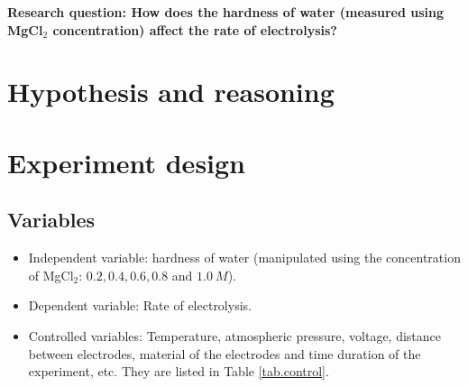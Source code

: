 \documentclass[a4paper]{article}
\begin{document}
\textbf{Research question: How does the hardness of water (measured using MgCl$_2$ concentration) affect the rate of electrolysis?}

\section{Hypothesis and reasoning}



\section{Experiment design}

\subsection{Variables} 

\begin{itemize}
    \item Independent variable: hardness of water (manipulated using the concentration of MgCl$_2$: $0.2, 0.4, 0.6, 0.8$ and $ 1.0\SI{}{M}$).
    \item Dependent variable: Rate of electrolysis.
    \item Controlled variables: Temperature, atmospheric pressure, voltage, distance between electrodes, material of the electrodes and time duration of the experiment, etc. They are listed in Table \ref{tab.control}.
\end{itemize}
\end{document}
